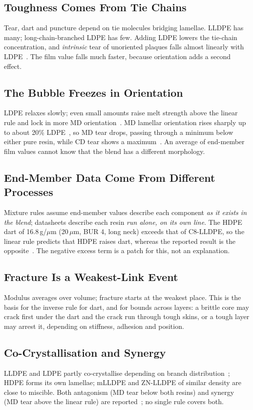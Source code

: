 \documentclass[conference,a4paper]{IEEEtran}
\newcommand{\um}{\,$\mu$m}
\begin{document}
\subsection{Toughness Comes From Tie Chains}
Tear, dart and puncture depend on tie molecules bridging lamellae. LLDPE has many; long-chain-branched LDPE has few. Adding LDPE lowers the tie-chain concentration, and \emph{intrinsic} tear of unoriented plaques falls almost linearly with LDPE~\cite{savar,jpfs}. The film value falls much faster, because orientation adds a second effect.

\subsection{The Bubble Freezes in Orientation}
LDPE relaxes slowly; even small amounts raise melt strength above the linear rule and lock in more MD orientation~\cite{savar,tas}. MD lamellar orientation rises sharply up to about 20\% LDPE~\cite{savar}, so MD tear drops, passing through a minimum below either pure resin, while CD tear shows a maximum~\cite{savar,us11214659}. An average of end-member film values cannot know that the blend has a different morphology.

\subsection{End-Member Data Come From Different Processes}
Mixture rules assume end-member values describe each component \emph{as it exists in the blend}; datasheets describe each resin \emph{run alone, on its own line}. The HDPE dart of 16.8\,g/$\mu$m (20\um, BUR 4, long neck) exceeds that of C8-LLDPE, so the linear rule predicts that HDPE raises dart, whereas the reported result is the opposite~\cite{elkoun,us6355733}. The negative excess term is a patch for this, not an explanation.

\subsection{Fracture Is a Weakest-Link Event}
Modulus averages over volume; fracture starts at the weakest place. This is the basis for the inverse rule for dart, and for bounds across layers: a brittle core may crack first under the dart and the crack run through tough skins, or a tough layer may arrest it, depending on stiffness, adhesion and position.

\subsection{Co-Crystallisation and Synergy}
LLDPE and LDPE partly co-crystallise depending on branch distribution~\cite{savar}; HDPE forms its own lamellae; mLLDPE and ZN-LLDPE of similar density are close to miscible. Both antagonism (MD tear below both resins) and synergy (MD tear above the linear rule) are reported~\cite{us11214659}; no single rule covers both.
\end{document}
